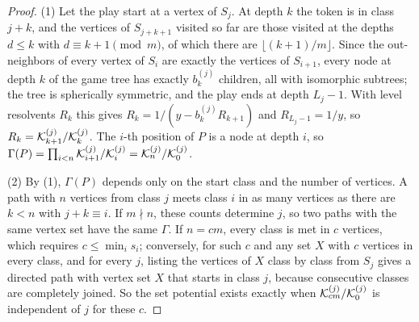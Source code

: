 \begin{proof}
(1) Let the play start at a vertex of $S_j$. At depth $k$ the token is in class $j+k$, and the vertices of $S_{j+k+1}$ visited so far are those visited at the depths $d\le k$ with $d\equiv k+1\pmod m$, of which there are $\lfloor(k+1)/m\rfloor$. Since the out-neighbors of every vertex of $S_i$ are exactly the vertices of $S_{i+1}$, every node at depth $k$ of the game tree has exactly $b^{(j)}_k$ children, all with isomorphic subtrees; the tree is spherically symmetric, and the play ends at depth $L_j-1$. With level resolvents $R_k$ this gives $R_k=1/(y-b^{(j)}_kR_{k+1})$ and $R_{L_j-1}=1/y$, so $R_k=\mathcal{K}^{(j)}_{k+1}/\mathcal{K}^{(j)}_k$. The $i$-th position of $P$ is a node at depth $i$, so $\Gamma(P)=\prod_{i<n}\mathcal{K}^{(j)}_{i+1}/\mathcal{K}^{(j)}_i=\mathcal{K}^{(j)}_n/\mathcal{K}^{(j)}_0$.

(2) By (1), $\Gamma(P)$ depends only on the start class and the number of vertices. A path with $n$ vertices from class $j$ meets class $i$ in as many vertices as there are $k<n$ with $j+k\equiv i$. If $m\nmid n$, these counts determine $j$, so two paths with the same vertex set have the same $\Gamma$. If $n=cm$, every class is met in $c$ vertices, which requires $c\le\min_is_i$; conversely, for such $c$ and any set $X$ with $c$ vertices in every class, and for every $j$, listing the vertices of $X$ class by class from $S_j$ gives a directed path with vertex set $X$ that starts in class $j$, because consecutive classes are completely joined. So the set potential exists exactly when $\mathcal{K}^{(j)}_{cm}/\mathcal{K}^{(j)}_0$ is independent of $j$ for these $c$.
\end{proof}

